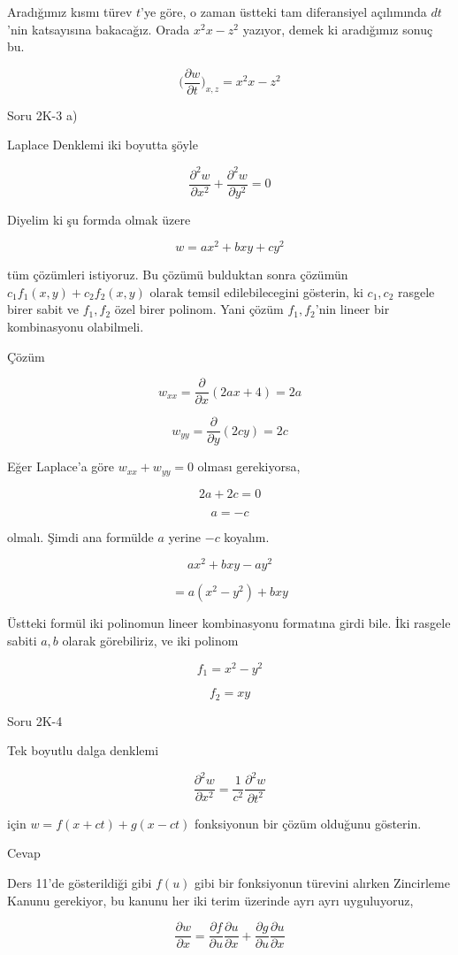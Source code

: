 \documentclass[12pt,fleqn]{article}\usepackage{../../common}
\begin{document}
Aradığımız kısmı türev $t$'ye göre, o zaman üstteki tam diferansiyel
açılımında $dt$'nin katsayısına bakacağız. Orada $x^2x-z^2$ yazıyor, demek
ki aradığımız sonuç bu. 

$$ \bigg( \frac{\partial w}{\partial t}  \bigg)_{x,z} = x^2x-z^2 $$

Soru 2K-3 a)

Laplace Denklemi iki boyutta şöyle

$$ \frac{\partial^2 w}{\partial x^2} + 
\frac{\partial^2 w}{\partial y^2}  = 0
$$

Diyelim ki şu formda olmak üzere

$$ w = ax^2 + bxy + cy^2 $$

tüm çözümleri istiyoruz. Bu çözümü bulduktan sonra çözümün $c_1f_1(x,y) +
c_2f_2(x,y)$ olarak temsil edilebilecegini gösterin, ki $c_1,c_2$ rasgele
birer sabit ve $f_1,f_2$ özel birer polinom. Yani çözüm $f_1,f_2$'nin
lineer bir kombinasyonu olabilmeli.

Çözüm 

$$ w_{xx} = \frac{\partial }{\partial x} (2ax + 4) = 2a $$

$$ w_{yy} = \frac{\partial }{\partial y} (2cy) = 2c $$

Eğer Laplace'a göre $w_{xx} + w_{yy} = 0$ olması gerekiyorsa,

$$ 2a + 2c = 0 $$

$$ a = -c $$

olmalı. Şimdi ana formülde $a$ yerine $-c$ koyalım. 

$$ ax^2 + bxy -ay^2 $$

$$ = a(x^2-y^2) + bxy $$

Üstteki formül iki polinomun lineer kombinasyonu formatına girdi bile. İki
rasgele sabiti $a,b$ olarak görebiliriz, ve iki polinom

$$ f_1 = x^2-y^2 $$

$$ f_2 = xy $$

Soru 2K-4

Tek boyutlu dalga denklemi 

$$ \frac{\partial ^2w}{\partial x^2} = \frac{ 1}{c^2} 
\frac{\partial ^2w}{\partial t^2} $$

için $w = f(x+ct) + g(x-ct)$ fonksiyonun bir çözüm olduğunu gösterin. 

Cevap 

Ders 11'de gösterildiği gibi $f(u)$ gibi bir fonksiyonun türevini alırken
Zincirleme Kanunu gerekiyor, bu kanunu her iki terim üzerinde ayrı ayrı
uyguluyoruz,

$$ \frac{\partial w}{\partial x}  = 
\frac{\partial f}{\partial u}
\frac{\partial u}{\partial x} + 
\frac{\partial g}{\partial u}
\frac{\partial u}{\partial x} 
$$
\end{document}
